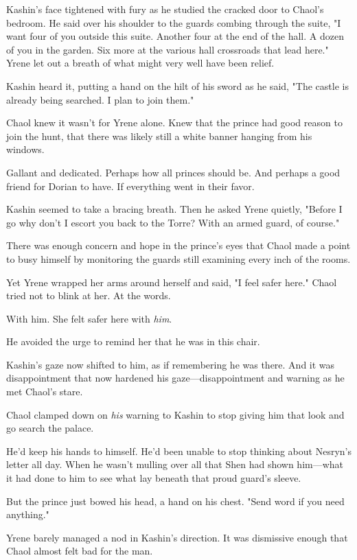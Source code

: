 Kashin's face tightened with fury as he studied the cracked door to Chaol's bedroom. He said over his shoulder to the guards combing through the suite, "I want four of you outside this suite. Another four at the end of the hall. A dozen of you in the garden. Six more at the various hall crossroads that lead here." Yrene let out a breath of what might very well have been relief.

Kashin heard it, putting a hand on the hilt of his sword as he said, "The castle is already being searched. I plan to join them."

Chaol knew it wasn't for Yrene alone. Knew that the prince had good reason to join the hunt, that there was likely still a white banner hanging from his windows.

Gallant and dedicated. Perhaps how all princes should be. And perhaps a good friend for Dorian to have. If everything went in their favor.

Kashin seemed to take a bracing breath. Then he asked Yrene quietly, "Before I go  why don't I escort you back to the Torre? With an armed guard, of course."

There was enough concern and hope in the prince's eyes that Chaol made a point to busy himself by monitoring the guards still examining every inch of the rooms.

Yet Yrene wrapped her arms around herself and said, "I feel safer here." Chaol tried not to blink at her. At the words.

With him. She felt safer here with \emph{him}.

He avoided the urge to remind her that he was in this chair.

Kashin's gaze now shifted to him, as if remembering he was there. And it was disappointment that now hardened his gaze---disappointment and warning as he met Chaol's stare.

Chaol clamped down on \emph{his} warning to Kashin to stop giving him that look and go search the palace.

He'd keep his hands to himself. He'd been unable to stop thinking about Nesryn's letter all day. When he wasn't mulling over all that Shen had shown him---what it had done to him to see what lay beneath that proud guard's sleeve.

But the prince just bowed his head, a hand on his chest. "Send word if you need anything."

Yrene barely managed a nod in Kashin's direction. It was dismissive enough that Chaol almost felt bad for the man.

